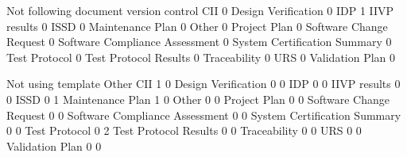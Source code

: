\documentclass{article}
\begin{document}
\begin{Schunk}
\begin{Soutput}
                                 Not following document version control
  CII                                                                 0
  Design Verification                                                 0
  IDP                                                                 1
  IIVP results                                                        0
  ISSD                                                                0
  Maintenance Plan                                                    0
  Other                                                               0
  Project Plan                                                        0
  Software Change Request                                             0
  Software Compliance Assessment                                      0
  System Certification Summary                                        0
  Test Protocol                                                       0
  Test Protocol Results                                               0
  Traceability                                                        0
  URS                                                                 0
  Validation Plan                                                     0

                                 Not using template Other
  CII                                             1     0
  Design Verification                             0     0
  IDP                                             0     0
  IIVP results                                    0     0
  ISSD                                            0     1
  Maintenance Plan                                1     0
  Other                                           0     0
  Project Plan                                    0     0
  Software Change Request                         0     0
  Software Compliance Assessment                  0     0
  System Certification Summary                    0     0
  Test Protocol                                   0     2
  Test Protocol Results                           0     0
  Traceability                                    0     0
  URS                                             0     0
  Validation Plan                                 0     0


\end{Soutput}
\end{Schunk}
\end{document}
